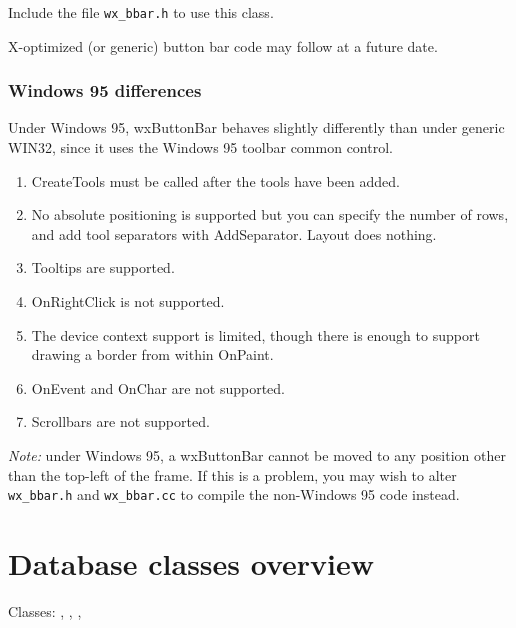 Include the file {\tt wx\_bbar.h} to use this class.

X-optimized (or generic) button bar code may follow at a future date.

\subsubsection{Windows 95 differences}

Under Windows 95, wxButtonBar behaves slightly differently than under generic WIN32,
since it uses the Windows 95 toolbar common control.

\begin{enumerate}\itemsep=0pt
\item CreateTools must be called after the tools have been added.
\item No absolute positioning is supported but you can specify the number
of rows, and add tool separators with AddSeparator. Layout does nothing.
\item Tooltips are supported.
\item OnRightClick is not supported.
\item The device context support is limited, though there is enough to support
drawing a border from within OnPaint.
\item OnEvent and OnChar are not supported.
\item Scrollbars are not supported.
\end{enumerate}

{\it Note:} under Windows 95, a wxButtonBar cannot be moved to any
position other than the top-left of the frame. If this is a problem, you may
wish to alter {\tt wx\_bbar.h} and {\tt wx\_bbar.cc} to compile the non-Windows 95
code instead.

\section{Database classes overview}\label{odbcoverview}

Classes: , , ,
\rtfsp{}


